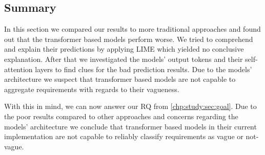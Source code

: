 \subsection{Summary}
\label{chp:study:sec:interpretation:subsec:summary}
In this section we compared our results to more traditional approaches and found out that the transformer based models perform worse.
We tried to comprehend and explain their predictions by applying \ac{LIME} which yielded no conclusive explanation.
After that we investigated the models' output tokens and their self-attention layers to find clues for the bad prediction results.
Due to the models' architecture we suspect that transformer based models are not capable to aggregate requirements with regards to their vagueness.

With this in mind, we can now answer our \ac{RQ} from \cref{chp:study:sec:goal}.
Due to the poor results compared to other approaches and concerns regarding the models' architecture we conclude that transformer based models in their current implementation are not capable to reliably classify requirements as vague or not-vague.
